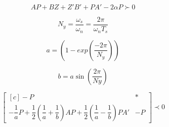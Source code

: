 \begin{equation}
  AP + BZ + Z'B' + PA' -2\alpha P\label{eq:LMIRightBounded} \succ 0
\end{equation}

\begin{equation}
  N_y = \dfrac{\omega_s}{\omega_n} = \dfrac{2\pi}{\omega_nT_s}\label{eq:ConstanteNy}
\end{equation}

\begin{equation}
  a = \left(1-exp{\left(\dfrac{-2\pi}{N_y}\right)}\right)\label{eq:PontoAElipse}
\end{equation}

\begin{equation}
  b = a\sin{\left(\dfrac{2\pi}{Ny}\right)}\label{eq:PontoBElipse}
\end{equation}

\begin{equation}
  \begin{bmatrix*}[c]
    -P & *\\
    -\dfrac{1}{a}P + \dfrac{1}{2}\left(\dfrac{1}{a}+\dfrac{1}{b}\right)AP + \dfrac{1}{2}\left(\dfrac{1}{a}-\dfrac{1}{b}\right)PA' & -P
  \end{bmatrix*}
  \prec 0\label{eq:LMIElipse}
\end{equation}